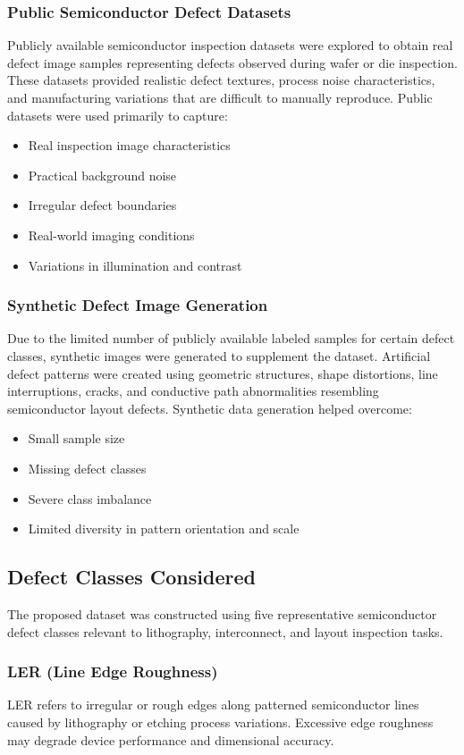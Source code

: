 \subsubsection{Public Semiconductor Defect Datasets}
Publicly available semiconductor inspection datasets were explored to obtain real defect image samples representing defects observed during wafer or die inspection. These datasets provided realistic defect textures, process noise characteristics, and manufacturing variations that are difficult to manually reproduce.
Public datasets were used primarily to capture:
\begin{itemize}
\item Real inspection image characteristics
\item Practical background noise
\item Irregular defect boundaries
\item Real-world imaging conditions
\item Variations in illumination and contrast
\end{itemize}

\subsubsection{Synthetic Defect Image Generation}
Due to the limited number of publicly available labeled samples for certain defect classes, synthetic images were generated to supplement the dataset. Artificial defect patterns were created using geometric structures, shape distortions, line interruptions, cracks, and conductive path abnormalities resembling semiconductor layout defects.
Synthetic data generation helped overcome:
\begin{itemize}
    \item Small sample size
    \item Missing defect classes
    \item Severe class imbalance
    \item Limited diversity in pattern orientation and scale
\end{itemize}

\subsection{Defect Classes Considered}
The proposed dataset was constructed using five representative semiconductor defect classes relevant to lithography, interconnect, and layout inspection tasks.

\subsubsection{LER (Line Edge Roughness)}
LER refers to irregular or rough edges along patterned semiconductor lines caused by lithography or etching process variations. Excessive edge roughness may degrade device performance and dimensional accuracy.

